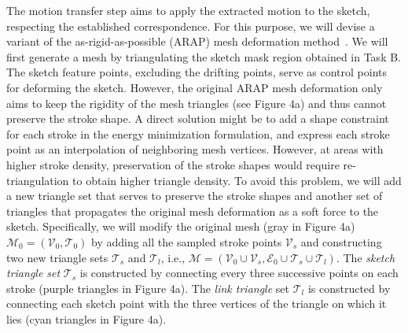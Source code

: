 {The motion transfer step aims to apply the extracted motion to the sketch, respecting the established correspondence. For this purpose, we will devise a variant of the as-rigid-as-possible (ARAP) mesh deformation method~\cite{Igarashi:2005}.
We will first generate a mesh by triangulating the sketch mask region obtained in Task B.
The sketch feature points, excluding the drifting points,  serve as control points for deforming the sketch. 
However, the original ARAP mesh deformation only aims to keep the rigidity of the mesh triangles (see Figure 4a) and
thus cannot preserve the stroke shape.
A direct solution might be to add a shape constraint for each stroke in the energy minimization formulation, and express each stroke point as an interpolation of neighboring mesh vertices. However, at areas with higher stroke density, preservation of the stroke shapes would require re-triangulation to obtain higher triangle density. To avoid this problem, we will add a new triangle set that serves to preserve the stroke shapes and another set of 
triangles that propagates the original mesh deformation as a soft force to the sketch.
Specifically, we will modify the original mesh (gray in Figure 4a) $ \mathcal{M}_0 = (\mathcal{V}_0, \mathcal{T}_0) $ by adding all the sampled stroke points $ \mathcal{V}_s $ and constructing two new triangle sets $ \mathcal{T}_s $ and $ \mathcal{T}_l $, i.e.,
$ \mathcal{M} = (\mathcal{V}_0 \cup \mathcal{V}_s, \mathcal{E}_0 \cup \mathcal{T}_s \cup \mathcal{T}_l) $. 
The \textit{sketch triangle set} $\mathcal{T}_s $ is constructed by connecting every three successive points on each stroke (purple triangles in Figure 4a).
The \textit{link triangle} set $\mathcal{T}_l $ is constructed by connecting each sketch point with the three vertices of the triangle on which it lies
(cyan triangles in Figure 4a).

%	

}
